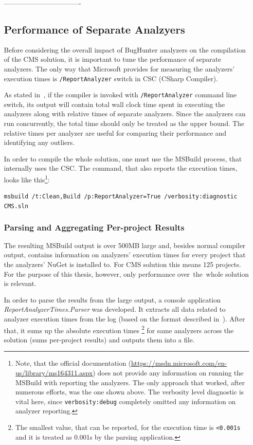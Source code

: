 \documentclass[
  digital, %
  table,   %
  lof,     %
  lot,     %
  oneside,
]{fithesis3}
\begin{document}
----------------------------------

\subsection{Performance of Separate Analzyers}
Before considering the overall impact of BugHunter analyzers on the compilation of the CMS solution, it is important to tune the performance of separate analyzers. The only way that Microsoft provides for measuring the analyzers' execution times is \texttt{/ReportAnalyzer} switch in CSC (CSharp Compiler).

As stated in~\cite{report-analyzer}, if the compiler is invoked with \texttt{/ReportAnalyzer} command line switch, its output will contain total wall clock time spent in executing the analyzers along with relative times of separate analyzers. Since the analyzers can run concurrently, the total time should only be treated as the upper bound. The relative times per analyzer are useful for comparing their performance and identifying any outliers.

In order to compile the whole solution, one must use the MSBuild process, that internally uses the CSC.
The command, that also reports the execution times, looks like this\footnote{Note, that the official documentation (\url{https://msdn.microsoft.com/en-us/library/ms164311.aspx}) does not provide any information on running the MSBuild with reporting the analyzers. The only approach that worked, after numerous efforts, was the one shown above. The verbosity level diagnostic is vital here, since \texttt{verbosity:debug} completely omitted any information on analyzer reporting.}:

\begin{center}
\texttt{msbuild /t:Clean,Build /p:ReportAnalyzer=True /verbosity:diagnostic CMS.sln}
\end{center}

\subsubsection{\textbf{Parsing and Aggregating Per-project Results}}
The resulting MSBuild output is over 500MB large and, besides normal compiler output, contains information on analyzers' execution times for every project that the analyzers' NuGet is installed to. For CMS solution this means 125 projects. For the purpose of this thesis, however, only performance over~the~whole solution is relevant. 

In order to parse the results from the large output, a console application \textit{ReportAnalyzerTimes.Parser} was developed. It extracts all data related to analyzer execution times from the log (based on the format described in~\cite{report-analyzer}). After that, it sums up the absolute execution times \footnote{The smallest value, that can be reported, for the execution time is \texttt{<0.001s} and it is treated as 0.001s by the parsing application.} for same analyzers across the solution (sums per-project results) and outputs them into a file.
\end{document}
